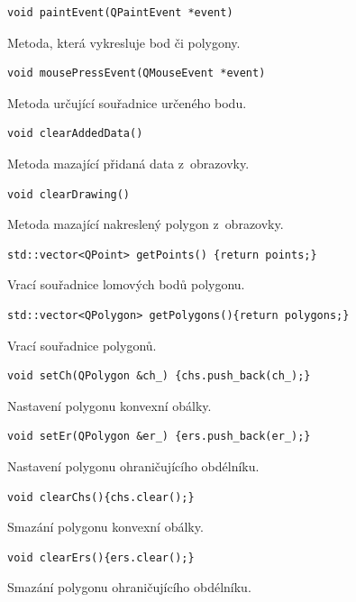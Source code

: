 \documentclass[a4paper, 12pt, oneside, titlepage]{article} %
\begin{document}
\begin{verbatim}
void paintEvent(QPaintEvent *event)
\end{verbatim}
Metoda, která vykresluje bod či polygony.\\

\begin{verbatim}
void mousePressEvent(QMouseEvent *event)
\end{verbatim}
Metoda určující souřadnice určeného bodu.\\

\begin{verbatim}
void clearAddedData()
\end{verbatim}
Metoda mazající přidaná data z~obrazovky.\\

\begin{verbatim}
void clearDrawing()
\end{verbatim}
Metoda mazající nakreslený polygon z~obrazovky.\\

\begin{verbatim}
std::vector<QPoint> getPoints() {return points;}
\end{verbatim}
Vrací souřadnice lomových bodů polygonu.\\

\begin{verbatim}
std::vector<QPolygon> getPolygons(){return polygons;}
\end{verbatim}
Vrací souřadnice polygonů.\\

\begin{verbatim}
void setCh(QPolygon &ch_) {chs.push_back(ch_);}
\end{verbatim}
Nastavení polygonu konvexní obálky.\\

\begin{verbatim}
void setEr(QPolygon &er_) {ers.push_back(er_);}
\end{verbatim}
Nastavení polygonu ohraničujícího obdélníku.\\

\begin{verbatim}
void clearChs(){chs.clear();}
\end{verbatim}
Smazání polygonu konvexní obálky.\\

\begin{verbatim}
void clearErs(){ers.clear();}
\end{verbatim}
Smazání polygonu ohraničujícího obdélníku.\\
\end{document}
